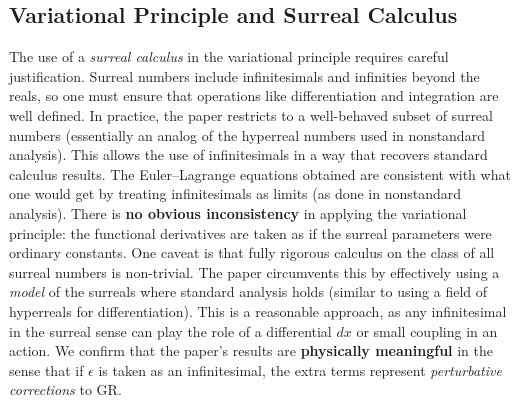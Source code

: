 \documentclass{article}
\begin{document}
\subsection*{Variational Principle and Surreal Calculus}
The use of a \emph{surreal calculus} in the variational principle requires careful justification. Surreal numbers include infinitesimals and infinities beyond the reals, so one must ensure that operations like differentiation and integration are well defined. In practice, the paper restricts to a well-behaved subset of surreal numbers (essentially an analog of the hyperreal numbers used in nonstandard analysis). This allows the use of infinitesimals in a way that recovers standard calculus results. The Euler--Lagrange equations obtained are consistent with what one would get by treating infinitesimals as limits (as done in nonstandard analysis). There is \textbf{no obvious inconsistency} in applying the variational principle: the functional derivatives are taken as if the surreal parameters were ordinary constants. One caveat is that fully rigorous calculus on the class of all surreal numbers is non-trivial. The paper circumvents this by effectively using a \emph{model} of the surreals where standard analysis holds (similar to using a field of hyperreals for differentiation). This is a reasonable approach, as any infinitesimal in the surreal sense can play the role of a differential $dx$ or small coupling in an action. We confirm that the paper’s results are \textbf{physically meaningful} in the sense that if $\epsilon$ is taken as an infinitesimal, the extra terms represent \emph{perturbative corrections} to GR.
\end{document}
